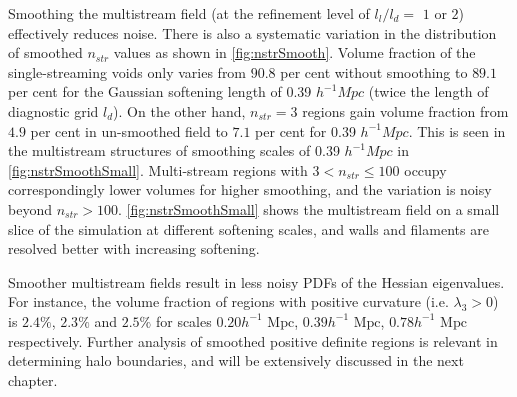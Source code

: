 Smoothing the multistream field (at the refinement level of $l_l/l_d=$ $1$ or $2$) effectively reduces noise. There is also a systematic variation in the distribution of smoothed $n_{str}$ values as shown in \autoref{fig:nstrSmooth}. Volume fraction of the single-streaming voids only varies from $90.8$ per cent without smoothing to $89.1$ per cent for the Gaussian softening length of 0.39 $h^{-1} Mpc$ (twice the length of diagnostic grid $l_d$). On the other hand, $n_{str} = 3$ regions gain volume fraction from $4.9$ per cent in un-smoothed field to $7.1$ per cent for 0.39 $h^{-1} Mpc$. This is seen in the multistream structures of smoothing scales of 0.39 $h^{-1} Mpc$ in \autoref{fig:nstrSmoothSmall}. Multi-stream regions with $ 3 < n_{str} \leq 100 $ occupy correspondingly lower volumes for higher smoothing, and the variation is noisy beyond $n_{str} > 100$. \autoref{fig:nstrSmoothSmall} shows the multistream field on a small slice of the simulation at different softening scales, and walls and filaments are resolved better with increasing softening.                                                                

Smoother multistream fields result in less noisy PDFs of the Hessian eigenvalues. For instance, the volume fraction of regions with positive curvature (i.e. $\lambda_3 > 0$) is $2.4\%$, $2.3\%$ and $2.5\%$ for scales $0.20 h^{-1} \text{ Mpc}$, $0.39 h^{-1} \text{ Mpc}$, $0.78 h^{-1} \text{ Mpc}$ respectively. Further analysis of smoothed positive definite regions is relevant in determining halo boundaries, and will be extensively discussed in the next chapter. 

